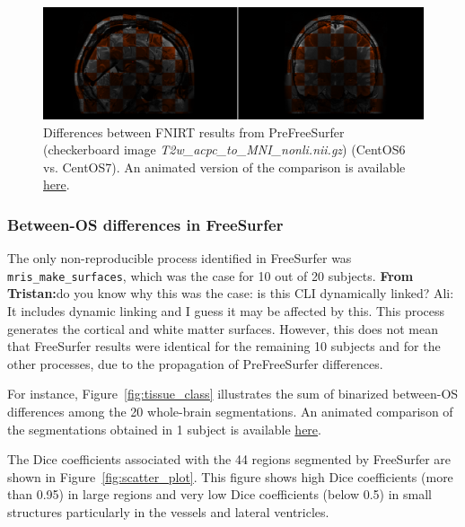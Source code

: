 \documentclass[a4paper,num-refs]{oup-contemporary}
\newcommand{\tristan}[1]{\color{blue}\textbf{From Tristan:}#1\color{black}}
\begin{document}
\begin{figure}
  \centering
    \includegraphics[width=\columnwidth]{images/t2w_alignment.png} 
    \caption{Differences between FNIRT results from PreFreeSurfer 
    (checkerboard image \emph{T2w\_acpc\_to\_MNI\_nonli.nii.gz}) (CentOS6 vs. 
    CentOS7). An animated version of the comparison is available 
    \href{https://github.com/ali4006/HCP-reproducibility-paper/blob/master/images/pfs_t2w_alignment.gif}
    {here}.
} 
    \label{fig:fnirt_result}
\end{figure}


\subsubsection{Between-OS differences in FreeSurfer} 

The only non-reproducible process identified in FreeSurfer was
\texttt{mris\_make\_surfaces}, which was the case for 10 out of 20
subjects. \tristan{do you know why this was the case: is this CLI
dynamically linked? Ali: It includes dynamic linking and I guess it may be affected by this.} 
This process generates the cortical and white matter
surfaces. However, this does not mean that FreeSurfer results were
identical for the remaining 10 subjects and for the other processes, due to the
propagation of PreFreeSurfer differences.

For instance, Figure~\ref{fig:tissue_class} illustrates the sum of
binarized between-OS differences among the 20 whole-brain segmentations. An
animated comparison of the segmentations obtained in 1 subject is available
\href{https://github.com/ali4006/HCP-reproducibility-paper/blob/master/images/fs_brain_segmentation.gif}
{here}.

The Dice coefficients associated with the 44 regions segmented by
FreeSurfer are shown in Figure~\ref{fig:scatter_plot}. This figure shows
high Dice coefficients (more than 0.95) in large regions and very low Dice
coefficients (below 0.5) in small structures particularly in the vessels
and lateral ventricles.
\end{document}
